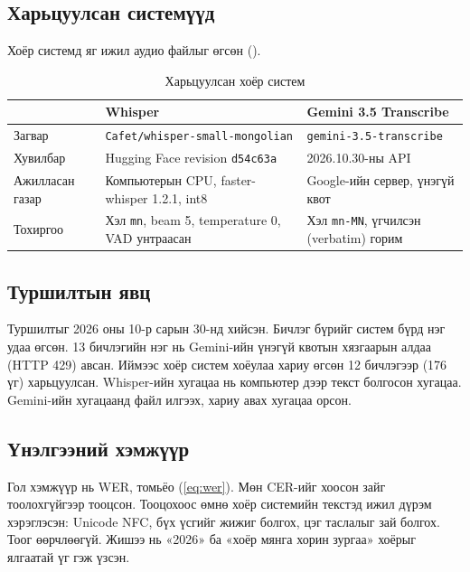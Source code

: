 \subsection{Харьцуулсан системүүд}
\label{sec:stt-systems}

Хоёр системд яг ижил аудио файлыг өгсөн ().

\begin{table}[H]
\centering
\caption{Харьцуулсан хоёр систем}
\label{tab:stt_setup}
\begin{tabular}{|p{3.0cm}|p{5.4cm}|p{5.2cm}|}
\hline
 & \textbf{Whisper} & \textbf{Gemini 3.5 Transcribe} \\
\hline
Загвар & \texttt{Cafet/\allowbreak whisper-small-\allowbreak mongolian} \cite{cafet_whisper_small_mn} & \texttt{gemini-3.5-transcribe} \cite{google_transcribe_model} \\
\hline
Хувилбар & Hugging Face revision \texttt{d54c63a} & 2026.10.30-ны API \\
\hline
Ажилласан газар & Компьютерын CPU, faster-whisper 1.2.1, int8 & Google-ийн сервер, үнэгүй квот \\
\hline
Тохиргоо & Хэл \texttt{mn}, beam 5, temperature 0, VAD унтраасан & Хэл \texttt{mn-MN}, үгчилсэн (verbatim) горим \\
\hline
\end{tabular}
\end{table}

\subsection{Туршилтын явц}
\label{sec:stt-procedure}

Туршилтыг 2026 оны 10-р сарын 30-нд хийсэн. Бичлэг бүрийг систем бүрд нэг удаа өгсөн. 13 бичлэгийн нэг нь Gemini-ийн үнэгүй квотын хязгаарын алдаа (HTTP 429) авсан. Иймээс хоёр систем хоёулаа хариу өгсөн 12 бичлэгээр (176 үг) харьцуулсан. Whisper-ийн хугацаа нь компьютер дээр текст болгосон хугацаа. Gemini-ийн хугацаанд файл илгээх, хариу авах хугацаа орсон.

\subsection{Үнэлгээний хэмжүүр}
\label{sec:stt-metrics}

Гол хэмжүүр нь \ac{WER}, томьёо (\ref{eq:wer}). Мөн \ac{CER}-ийг хоосон зайг тоолохгүйгээр тооцсон. Тооцохоос өмнө хоёр системийн текстэд ижил дүрэм хэрэглэсэн: Unicode NFC, бүх үсгийг жижиг болгох, цэг таслалыг зай болгох. Тоог өөрчлөөгүй. Жишээ нь «2026» ба «хоёр мянга хорин зургаа» хоёрыг ялгаатай үг гэж үзсэн.

